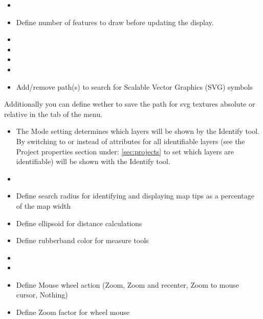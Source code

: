 
\begin{itemize}
\item {}
\item Define number of features to draw before updating the display.
\item {}
\item {}
\item {}
\item {}
\item Add/remove path(s) to search for Scalable Vector Graphics (SVG) symbols
\end{itemize}

Additionally you can define wether to save the path for svg textures
absolute or relative in the  tab of the
 \arrow {}
menu.


\begin{itemize}
\item The Mode setting determines which layers will be shown by the Identify
tool. By switching to  or  instead of  attributes for all identifiable
layers (see the Project properties section under: \ref{sec:projects} to set
which layers are identifiable) will be shown with the Identify tool.
\item {}
\item Define search radius for identifying and displaying map tips as a
percentage of the map width
\item Define ellipsoid for distance calculations
\item Define rubberband color for measure tools
\item {}
\item {}
\item Define Mouse wheel action (Zoom, Zoom and recenter, Zoom to mouse
cursor, Nothing)
\item Define Zoom factor for wheel mouse
\end{itemize}

